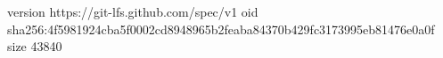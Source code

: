 version https://git-lfs.github.com/spec/v1
oid sha256:4f5981924cba5f0002cd8948965b2feaba84370b429fc3173995eb81476e0a0f
size 43840
